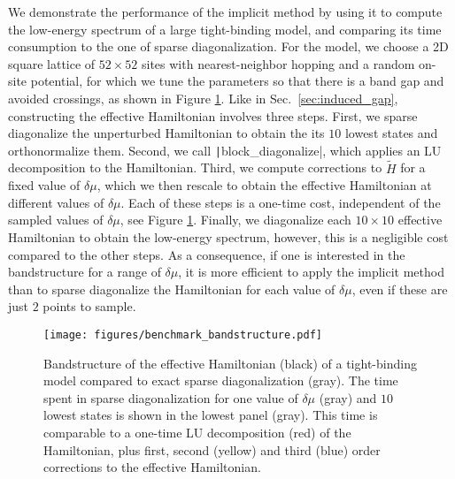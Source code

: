 We demonstrate the performance of the implicit method by using it to compute the low-energy spectrum of a large tight-binding model, and comparing its time consumption to the one of sparse diagonalization.
For the model, we choose a 2D square lattice
of $52 \times 52$ sites with nearest-neighbor hopping and a random on-site potential, for which we tune the parameters so that there is a band gap and avoided crossings, as shown in Figure \ref{fig:benchmark_bandstructure}.
Like in Sec.~\ref{sec:induced_gap}, constructing the effective Hamiltonian involves three steps.
First, we sparse diagonalize the unperturbed Hamiltonian to obtain the its $10$ lowest states and orthonormalize them.
Second, we call \texttt|block_diagonalize|, which applies an LU decomposition to the Hamiltonian.
Third, we compute corrections to $\tilde{H}$ for a fixed value of $\delta \mu$, which we then rescale to obtain the effective Hamiltonian at different values of $\delta \mu$.
Each of these steps is a one-time cost, independent of the sampled values of $\delta \mu$, see Figure \ref{fig:benchmark_bandstructure}.
Finally, we diagonalize each $10 \times 10$ effective Hamiltonian to obtain the low-energy spectrum, however, this is a negligible cost compared to the other steps.
As a consequence, if one is interested in the bandstructure for a range of $\delta \mu$, it is more efficient to apply the implicit method than to sparse diagonalize the Hamiltonian for each value of $\delta \mu$, even if these are just $2$ points to sample.
%
\begin{figure}[h]
    \centering
    \texttt{[image: figures/benchmark\_bandstructure.pdf]}
    \caption{
        Bandstructure of the effective Hamiltonian (black) of a
        tight-binding model compared to exact sparse diagonalization (gray).
        The time spent in sparse diagonalization for one value of $\delta \mu$ (gray) and $10$ lowest states is shown in the lowest panel (gray).
        This time is comparable to a one-time LU decomposition (red) of the Hamiltonian, plus first, second (yellow) and third (blue) order corrections to the effective Hamiltonian.
        }
    \label{fig:benchmark_bandstructure}
\end{figure}
